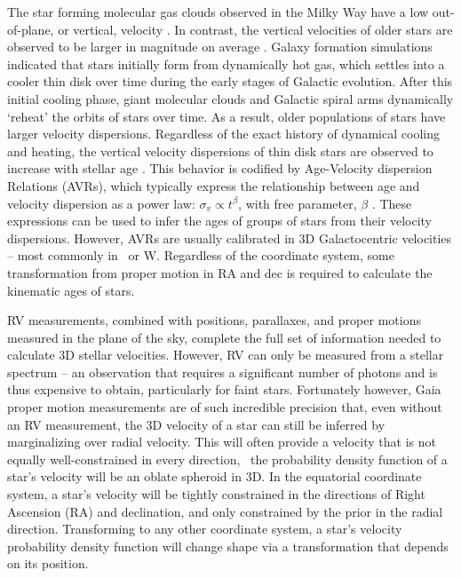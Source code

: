 The star forming molecular gas clouds observed in the Milky Way have a low
out-of-plane, or vertical, velocity \citep[\eg][]{stark1989, stark2005,
aumer2009, martig2014, aumer2016}.
In contrast, the vertical velocities of older stars are observed to be larger
in magnitude on average \citep{stromberg1946, wielen1977, nordstrom2004,
holmberg2007, holmberg2009, aumer2009, casagrande2011, ting2019, yu2018}.
Galaxy formation simulations indicated that stars initially form from
dynamically hot gas, which settles into a cooler thin disk over time during
the early stages of Galactic evolution.
After this initial cooling phase, giant molecular clouds and Galactic spiral
arms dynamically `reheat' the orbits of stars over time.
As a result, older populations of stars have larger velocity dispersions.
Regardless of the exact history of dynamical cooling and heating, the vertical
velocity dispersions of thin disk stars are observed to increase with stellar
age \citep{citations}.
This behavior is codified by Age-Velocity dispersion Relations (AVRs), which
typically express the relationship between age and velocity dispersion as a
power law: $\sigma_v \propto t^\beta$, with free parameter, $\beta$
\citep[\eg][]{holmberg2009, yu2018, mackereth2019}.
These expressions can be used to infer the ages of groups of stars from their
velocity dispersions.
However, AVRs are usually calibrated in 3D Galactocentric velocities -- most
commonly in \vz\ or W.
Regardless of the coordinate system, some transformation from proper motion in
RA and dec is required to calculate the kinematic ages of stars.

RV measurements, combined with positions, parallaxes, and proper motions
measured in the plane of the sky, complete the full set of information needed
to calculate 3D stellar velocities.
However, RV can only be measured from a stellar spectrum -- an observation
that requires a significant number of photons and is thus expensive to obtain,
particularly for faint stars.
Fortunately however, Gaia proper motion measurements are of such incredible
precision that, even without an RV measurement, the 3D velocity of a star can
still be inferred by marginalizing over radial velocity.
This will often provide a velocity that is not equally well-constrained in
every direction, \ie\ the probability density function of a star's velocity
will be an oblate spheroid in 3D.
In the equatorial coordinate system, a star's velocity will be tightly
constrained in the directions of Right Ascension (RA) and declination, and
only constrained by the prior in the radial direction.
Transforming to any other coordinate system, a star's velocity probability
density function will change shape via a transformation that depends on its
position.

